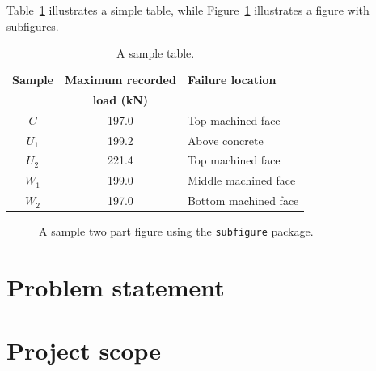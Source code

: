 Table~\ref{tab:demo} illustrates a simple table, while Figure~\ref{fig:demo} illustrates a figure with subfigures.



\begin{table}[htbp]
  \centering
  \begin{tabular}{ccl}
    \hline
    \textbf{Sample} & \textbf{Maximum recorded} &  \textbf{Failure location} \\
    \textbf{}		& \textbf{load (kN)}		&  \textbf{} \\
    \hline
    $C$    &  197.0  &  Top machined face     \\
    $U_1$  &  199.2  &  Above concrete        \\
    $U_2$  &  221.4  &  Top machined face     \\
    $W_1$  &  199.0  &  Middle machined face  \\
    $W_2$  &  197.0  &  Bottom machined face  \\
    \hline
    \end{tabular}
  \caption{A sample table.}
  \label{tab:demo}
\end{table}

\begin{figure}[htbp]
\centering
 \quad\quad
   \caption{A sample two part figure using the {\tt subfigure} package.}
  \label{fig:demo}
\end{figure}


\section{Problem statement}

\section{Project scope}
